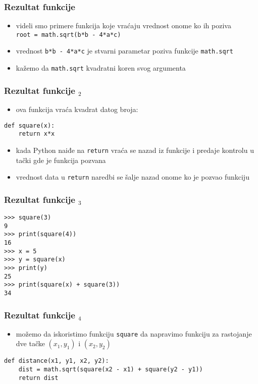 \documentclass[utf8,compress,aspectratio=169]{beamer}
\begin{document}
\begin{frame}[fragile]
  \frametitle{Rezultat funkcije}
  \begin{itemize}
    \item videli smo primere funkcija koje vraćaju vrednost onome ko ih poziva \\
      \texttt{root = math.sqrt(b*b - 4*a*c)}
    \item vrednost \texttt{b*b - 4*a*c} je stvarni parametar poziva funkcije \texttt{math.sqrt}
    \item kažemo da \texttt{math.sqrt}  kvadratni koren svog argumenta
  \end{itemize}
\end{frame}

\begin{frame}[fragile]
  \frametitle{Rezultat funkcije $_2$}
  \begin{itemize}
    \item ova funkcija vraća kvadrat datog broja: \\
  \end{itemize}
\begin{verbatim}
def square(x):
    return x*x
\end{verbatim}
  \begin{itemize}
    \item kada Python naiđe na \texttt{return} vraća se nazad iz funkcije i predaje kontrolu u tački gde je funkcija pozvana
    \item vrednost data u \texttt{return} naredbi se šalje nazad onome ko je pozvao funkciju
  \end{itemize}
\end{frame}

\begin{frame}[fragile]
  \frametitle{Rezultat funkcije $_3$}
\begin{verbatim}
>>> square(3)
9
>>> print(square(4))
16
>>> x = 5
>>> y = square(x)
>>> print(y)
25
>>> print(square(x) + square(3))
34
\end{verbatim}
\end{frame}

\begin{frame}[fragile]
  \frametitle{Rezultat funkcije $_4$}
  \begin{itemize}
    \item možemo da iskoristimo funkciju \texttt{square} da napravimo funkciju za rastojanje dve tačke $(x_1,y_1)$ i $(x_2,y_2)$
  \end{itemize}
\begin{verbatim}
def distance(x1, y1, x2, y2):
    dist = math.sqrt(square(x2 - x1) + square(y2 - y1))
    return dist
\end{verbatim}
\end{frame}
\end{document}
